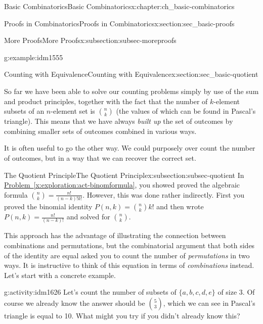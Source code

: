 \documentclass[oneside,10pt,]{book}
\numberwithin{equation}{chapter}
\begin{document}
\begin{chapterptx}{Basic Combinatorics}{}{Basic Combinatorics}{}{}{x:chapter:ch_basic-combinatorics}
\begin{sectionptx}{Proofs in Combinatorics}{}{Proofs in Combinatorics}{}{}{x:section:sec_basic-proofs}
\begin{subsectionptx}{More Proofs}{}{More Proofs}{}{}{x:subsection:subsec-moreproofs}
\begin{example}{}{g:example:idm1555}
\begin{enumerate}
\end{enumerate}
%
\end{example}
\end{subsectionptx}
\end{sectionptx}
%
%
\typeout{************************************************}
\typeout{************************************************}
%
\begin{sectionptx}{Counting with Equivalence}{}{Counting with Equivalence}{}{}{x:section:sec_basic-quotient}
\begin{introduction}{}%
So far we have been able to solve our counting problems simply by use of the sum and product principles, together with the fact that the number of \(k\)-element subsets of an \(n\)-element set is \(\binom{n}{k}\) (the values of which can be found in Pascal's triangle). This means that we have always \emph{built up} the set of outcomes by combining smaller sets of outcomes combined in various ways.%
\par
It is often useful to go the other way.  We could purposely over count the number of outcomes, but in a way that we can recover the correct set.%
\end{introduction}%
%
%
\typeout{************************************************}
\typeout{************************************************}
%
\begin{subsectionptx}{The Quotient Principle}{}{The Quotient Principle}{}{}{x:subsection:subsec-quotient}
In \hyperref[x:exploration:act-binomformula]{Problem~\ref{x:exploration:act-binomformula}}, you showed proved the algebraic formula \(\binom{n}{k} = \frac{n!}{(n-k)!k!}\).  However, this was done rather indirectly.  First you proved the binomial identity \(P(n,k) = \binom{n}{k}k!\) and then wrote \(P(n,k) = \frac{n!}{(n-k)!}\) and solved for \(\binom{n}{k}\).%
\par
This approach has the advantage of illustrating the connection between combinations and permutations, but the combinatorial argument that both sides of the identity are equal asked you to count the number of \emph{permutations} in two ways.  It is instructive to think of this equation in terms of \emph{combinations} instead.  Let's start with a concrete example.%
\begin{activity}{}{g:activity:idm1626}%
Let's count the number of subsets of \(\{a,b,c,d,e\}\) of size 3.  Of course we already know the answer should be \(\binom{5}{3}\), which we can see in Pascal's triangle is equal to 10.  What might you try if you didn't already know this?%

\end{activity}
\end{subsectionptx}
\end{sectionptx}
\end{chapterptx}
\end{document}
